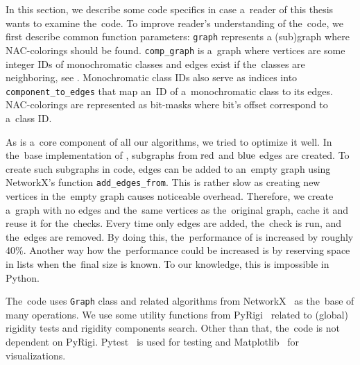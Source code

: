 In this section, we describe some code specifics
in case a~reader of this thesis wants to examine the~code.
%
To improve reader's understanding of the~code,
we first describe common function parameters:
\texttt{graph} represents a (sub)graph where NAC-colorings should be found.
%
\texttt{comp\_graph} is a~graph where vertices are some integer IDs of monochromatic classes
and edges exist if the~classes are neighboring,
see .
%
Monochromatic class IDs also serve as indices into \texttt{component\_to\_edges}
that map an~ID of a~monochromatic class to its edges.
%
NAC-colorings are represented as bit-masks where bit's offset correspond to a~class ID\@.

As \IsNACColoring{} is a~core component of all our algorithms,
we tried to optimize it well.
%
In the~base implementation of \IsNACColoring{},
subgraphs from \( \text{red} \) and \( \text{blue} \) edges are created.
To create such subgraphs in code, edges can be added to an~empty graph
using NetworkX's function \texttt{add\_edges\_from}.
%
This is rather slow as creating new vertices in the~empty graph causes noticeable overhead.
Therefore, we create a~graph with no edges and the~same vertices as the~original graph,
cache it and reuse it for the~checks.
Every time only edges are added, the~check is run, and the~edges are removed.
By doing this, the~performance of \IsNACColoring{} is increased by roughly 40\%.
%
Another way how the~performance could be increased is by reserving space in lists
when the~final size is known.
To our knowledge, this is impossible in Python.

The~code uses \texttt{Graph} class and related algorithms from NetworkX~\cite{networkx}
as the~base of many operations. We use some utility functions from PyRigi~\cite{pyrigi}
related to (global) rigidity tests and rigidity components search.
Other than that, the~code is not dependent on PyRigi.
%
Pytest~\cite{pytest} is used for testing and
Matplotlib~\cite{matplotlib} for visualizations.

